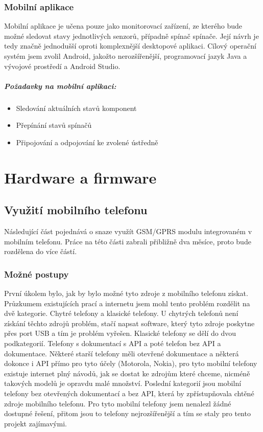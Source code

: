 \documentclass[FM,MP]{tulthesis}  %
\begin{document}
\subsection{Mobilní aplikace}
Mobilní aplikace je učena pouze jako monitorovací zařízení, ze kterého bude možné sledovat stavy jednotlivých senzorů, případně spínač spínače. Její návrh je tedy značně jednodušší oproti komplexnější desktopové aplikaci. Cílový operační systém jsem zvolil Android, jakožto nerozšířenější, programovací jazyk Java a vývojové prostředí a Android Studio.

\paragraph{Požadavky na mobilní aplikaci:}
\begin{itemize}
\item Sledování aktuálních stavů komponent
\item Přepínání stavů spínačů
\item Připojování a odpojování ke zvolené ústředně
\end{itemize} 


\chapter{Hardware a firmware}

\section{Využití mobilního telefonu}
Následující část pojednává o snaze využít GSM/GPRS modulu integrovaném v mobilním telefonu. Práce na této části zabrali přibližně dva měsíce, proto bude rozdělena do více částí.

\subsection{Možné postupy}
První úkolem bylo, jak by bylo možné tyto zdroje z mobilního telefonu získat. Průzkumem existujících prací a internetu jsem mohl tento problém rozdělit na dvě kategorie. Chytré telefony a klasické telefony. U chytrých telefonů není získání těchto zdrojů problém, stačí napsat software, který tyto zdroje poskytne přes port USB a tím je problém vyřešen. Klasické telefony se dělí do dvou podkategorií. Telefony s dokumentací s API a poté telefon bez API a dokumentace. Některé starší telefony měli otevřené dokumentace a některá dokonce i API přímo pro tyto účely (Motorola, Nokia), pro tyto mobilní telefony existuje internet plný návodů, jak se dostat ke zdrojům které chceme, nicméně takových modelů je opravdu malé množství. Poslední kategorií jsou mobilní telefony bez otevřených dokumentací a bez API, která by zpřístupňovala chtěné zdroje mobilního telefonu. Pro tyto mobilní telefony jsem nenalezl žádné dostupné řešení, přitom jsou to telefony nejrozšířenější a tím se staly pro tento projekt zajímavými.
\end{document}
